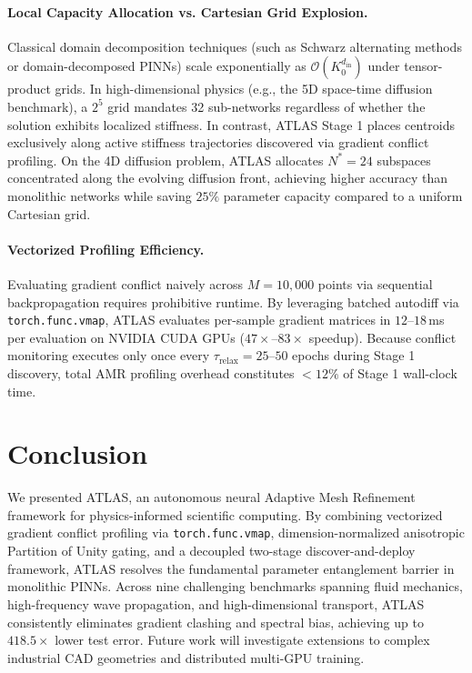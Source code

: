 \documentclass[runningheads]{llncs}
\begin{document}
\paragraph{Local Capacity Allocation vs. Cartesian Grid Explosion.} Classical domain decomposition techniques (such as Schwarz alternating methods or domain-decomposed PINNs) scale exponentially as $\mathcal{O}(K_0^{d_{\text{in}}})$ under tensor-product grids. In high-dimensional physics (e.g., the 5D space-time diffusion benchmark), a $2^5$ grid mandates 32 sub-networks regardless of whether the solution exhibits localized stiffness. In contrast, ATLAS Stage 1 places centroids exclusively along active stiffness trajectories discovered via gradient conflict profiling. On the 4D diffusion problem, ATLAS allocates $N^*=24$ subspaces concentrated along the evolving diffusion front, achieving higher accuracy than monolithic networks while saving $25\%$ parameter capacity compared to a uniform Cartesian grid.

\paragraph{Vectorized Profiling Efficiency.} Evaluating gradient conflict naively across $M=10{,}000$ points via sequential backpropagation requires prohibitive runtime. By leveraging batched autodiff via \texttt{torch.func.vmap}, ATLAS evaluates per-sample gradient matrices in $12\text{--}18$\,ms per evaluation on NVIDIA CUDA GPUs ($47\times\text{--}83\times$ speedup). Because conflict monitoring executes only once every $\tau_{\text{relax}} = 25\text{--}50$ epochs during Stage 1 discovery, total AMR profiling overhead constitutes $<12\%$ of Stage 1 wall-clock time.

\section{Conclusion}
\label{sec:conclusion}
We presented ATLAS, an autonomous neural Adaptive Mesh Refinement framework for physics-informed scientific computing. By combining vectorized gradient conflict profiling via \texttt{torch.func.vmap}, dimension-normalized anisotropic Partition of Unity gating, and a decoupled two-stage discover-and-deploy framework, ATLAS resolves the fundamental parameter entanglement barrier in monolithic PINNs. Across nine challenging benchmarks spanning fluid mechanics, high-frequency wave propagation, and high-dimensional transport, ATLAS consistently eliminates gradient clashing and spectral bias, achieving up to $418.5\times$ lower test error. Future work will investigate extensions to complex industrial CAD geometries and distributed multi-GPU training.
\end{document}
